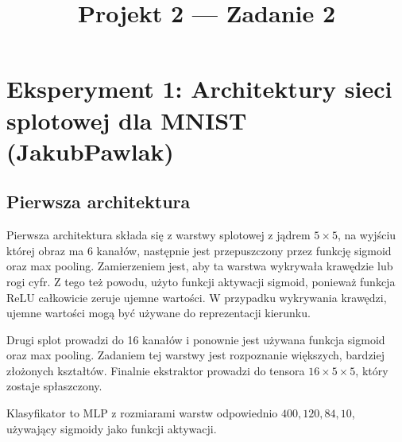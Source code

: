 \documentclass[10pt]{article}
\title{Projekt 2 --- Zadanie 2}
\begin{document}
\maketitle
\normalsize

\section{Eksperyment 1: Architektury sieci splotowej dla MNIST (JakubPawlak)}\label{sec:ex1-pawlak_mnist}

\subsection*{Pierwsza architektura}

Pierwsza architektura składa się z warstwy splotowej z jądrem $5\times5$, na wyjściu której obraz ma 6 kanałów, następnie jest przepuszczony przez funkcję sigmoid oraz max pooling.
Zamierzeniem jest, aby ta warstwa wykrywała krawędzie lub rogi cyfr.
Z tego też powodu, użyto funkcji aktywacji sigmoid, ponieważ funkcja ReLU całkowicie zeruje ujemne wartości.
W przypadku wykrywania krawędzi, ujemne wartości mogą być używane do reprezentacji kierunku.

Drugi splot prowadzi do 16 kanałów i ponownie jest używana funkcja sigmoid oraz max pooling.
Zadaniem tej warstwy jest rozpoznanie większych, bardziej złożonych kształtów.
Finalnie ekstraktor prowadzi do tensora $16 \times 5 \times 5$, który zostaje spłaszczony.

Klasyfikator to MLP z rozmiarami warstw odpowiednio $400,120,84,10$, używający sigmoidy jako funkcji aktywacji.

\kubaMnistLarge{}
\end{document}
